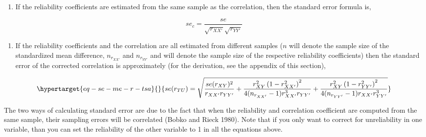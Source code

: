 \documentclass[
  letterpaper,
  DIV=11,
  numbers=noendperiod]{scrreprt}
\providecommand{\tightlist}{%
  \setlength{\itemsep}{0pt}\setlength{\parskip}{0pt}}\usepackage{longtable,booktabs,array}
\begin{document}
\begin{enumerate}
\def\labelenumi{\arabic{enumi}.}
\tightlist
\item
  If the reliability coefficients are estimated from the same sample as
  the correlation, then the standard error formula is,
\end{enumerate}

\[
se_c =  \frac{se}{\sqrt{r_{XX'}}\sqrt{r_{YY'}}}
\]

\begin{enumerate}
\def\labelenumi{\arabic{enumi}.}
\setcounter{enumi}{1}
\tightlist
\item
  If the reliability coefficients and the correlation are all estimated
  from different samples (\(n\) will denote the sample size of the
  standardized mean difference, \(n_{r_{XX'}}\) and \(n_{r_{YY'}}\) and
  will denote the sample size of the respective reliability
  coefficients) then the standard error of the corrected correlation is
  approximately (for the derivation, see the appendix of this section),
\end{enumerate}

\begin{equation}\protect\hypertarget{eq-se-me-r-tsa}{}{
se(r_{TU}) = \sqrt{\frac{se(r_{XY})^2}{r_{XX'}r_{YY'}} + 
\frac{r^2_{XY}\left(1-r^2_{XX'}\right)^2}{4(n_{r_{XX'}}-1)r_{XX'}^3r_{YY'}} + 
\frac{r^2_{XY}\left(1-r^2_{YY'}\right)^2}{4(n_{r_{YY'}}-1)r_{XX'}r_{YY'}^3}}
}\label{eq-se-me-r-tsa}\end{equation}

The two ways of calculating standard error are due to the fact that when
the reliability and correlation coefficient are computed from the same
sample, their sampling errors will be correlated (Bobko and Rieck 1980).
Note that if you only want to correct for unreliability in one variable,
than you can set the reliability of the other variable to 1 in all the
equations above.
\end{document}
